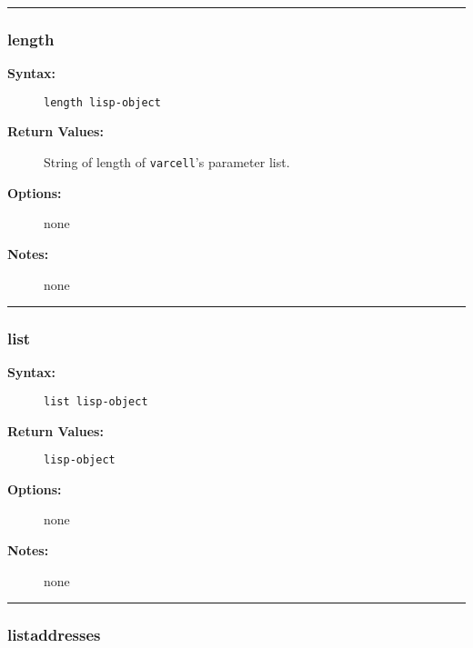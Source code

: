 \hrule
\subsubsection{length}

\begin{description}
\item[{\bf Syntax:}] \mbox{}

{\tt length lisp-object}

\item[{\bf Return Values:}] \mbox{}

String of length of {\tt varcell}'s 
parameter list.

\item[{\bf Options:}] \mbox{}

none  

\item[{\bf Notes:}] \mbox{}

none  

\end{description}


\hrule
\subsubsection{list}

\begin{description}
\item[{\bf Syntax:}] \mbox{}

{\tt list lisp-object}

\item[{\bf Return Values:}] \mbox{}

{\tt lisp-object}

\item[{\bf Options:}] \mbox{}

none  

\item[{\bf Notes:}] \mbox{}

none

\end{description}


\hrule
\subsubsection{listaddresses}

